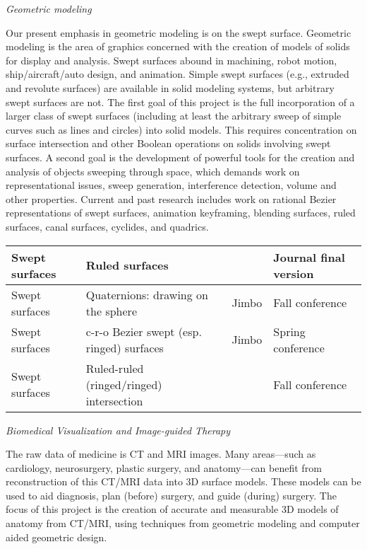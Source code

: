 \clearpage

\centerline{\em Geometric modeling}

Our present emphasis in geometric modeling  is on the swept surface.
Geometric modeling is the area of graphics concerned with the 
creation of models of solids for display and analysis.
Swept surfaces abound in machining, robot motion, ship/aircraft/auto design,
and animation.
Simple swept surfaces (e.g., extruded and revolute surfaces) are available 
in solid modeling systems, but arbitrary swept surfaces are not.
The first goal of this project is the full incorporation of a larger class of
swept surfaces (including at least the arbitrary sweep of simple curves
such as lines and circles) into solid models.
This requires concentration on surface intersection and other Boolean operations
on solids involving swept surfaces.
A second goal is the development of powerful tools for the creation and
analysis of objects sweeping through space, which demands work on 
representational issues, sweep generation, interference detection, volume
and other properties.
Current and past research includes work on rational Bezier 
representations of swept surfaces, animation keyframing, 
blending surfaces, ruled surfaces, 
canal surfaces, cyclides, and quadrics.

\vspace{2in}

\begin{table}[h]
\centering
\begin{tabular}{|l|l|l|l|}
\hline
Swept surfaces & Ruled surfaces &  & Journal final version \\
\hline
Swept surfaces & Quaternions: drawing on the sphere & Jimbo & Fall conference \\
\hline
Swept surfaces & c-r-o Bezier swept (esp. ringed) surfaces & Jimbo & Spring conference \\
\hline
Swept surfaces & Ruled-ruled (ringed/ringed) intersection & & Fall conference \\
\hline
\end{tabular}
\end{table}

\clearpage

\centerline{\em Biomedical Visualization and Image-guided Therapy}

The raw data of medicine is CT and MRI images.
Many areas---such as cardiology, neurosurgery, plastic surgery, 
and anatomy---can benefit from reconstruction of this CT/MRI data into
3D surface models.  These models can be used to aid diagnosis,
plan (before) surgery, and guide (during) surgery.
The focus of this project is the creation of accurate and measurable
3D models of anatomy from CT/MRI, using techniques from geometric
modeling and computer aided geometric design.

